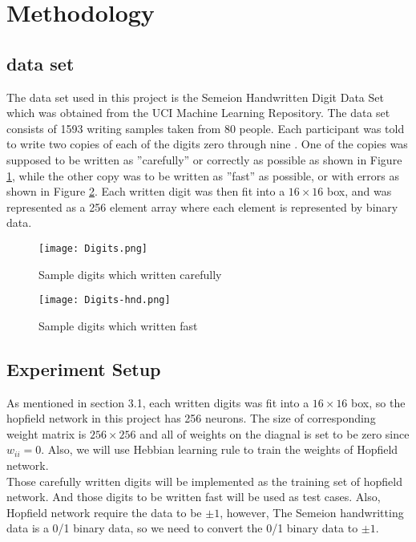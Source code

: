\section{Methodology}
\subsection{data set}
The data set used in this project is the Semeion Handwritten Digit Data Set which was obtained from the UCI Machine Learning Repository. The data set consists of 1593 writing samples taken from 80 people. Each participant was told to write two copies of each of the digits zero through nine . One of the copies was supposed to be written as ”carefully” or correctly as possible as shown in Figure \ref{fg:ds1}, while the other copy was to be written as ”fast” as possible, or with errors as shown in Figure \ref{fg:ds2}. Each written digit was then fit into a $16 \times 16$ box, and was represented as a 256 element array where each element is represented by binary data.\\

\begin{figure}[h]
\centering
\texttt{[image: Digits.png]}
\caption{Sample digits which written carefully}
\label{fg:ds1}
\end{figure}

\begin{figure}[h]
\centering
\texttt{[image: Digits-hnd.png]}
\caption{Sample digits which written fast}
\label{fg:ds2}
\end{figure}

\subsection{Experiment Setup}
As mentioned in section 3.1, each written digits was fit into a $16 \times 16$ box, so the hopfield network in this project has 256 neurons. The size of corresponding weight matrix is $256 \times 256$ and all of weights on the diagnal is set to be zero since $w_{ii} = 0$. Also, we will use Hebbian learning rule to train the weights of Hopfield network.\\

Those carefully written digits will be implemented as the training set of hopfield network. And those digits to be written fast will be used as test cases. Also, Hopfield network require the data to be $\pm 1$, however, The Semeion handwritting data is a 0/1 binary data, so we need to convert the 0/1 binary data to $\pm 1$. \\

